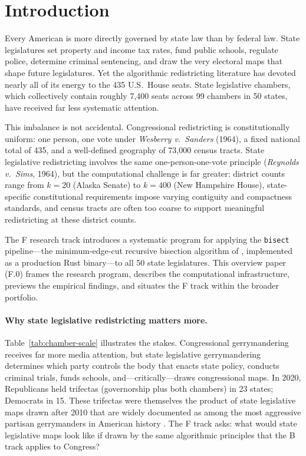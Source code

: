\section{Introduction}
\label{sec:intro}

Every American is more directly governed by state law than by federal law.
State legislatures set property and income tax rates, fund public schools,
regulate police, determine criminal sentencing, and draw the very electoral
maps that shape future legislatures. Yet the algorithmic redistricting
literature has devoted nearly all of its energy to the 435 U.S.\ House seats.
State legislative chambers, which collectively contain roughly 7,400 seats
across 99 chambers in 50 states, have received far less systematic attention.

This imbalance is not accidental. Congressional redistricting is constitutionally
uniform: one person, one vote under \emph{Wesberry v.\ Sanders} (1964), a fixed
national total of 435, and a well-defined geography of 73,000 census tracts.
State legislative redistricting involves the same one-person-one-vote principle
(\emph{Reynolds v.\ Sims}, 1964), but the computational challenge is far greater:
district counts range from $k = 20$ (Alaska Senate) to $k = 400$ (New Hampshire
House), state-specific constitutional requirements impose varying contiguity and
compactness standards, and census tracts are often too coarse to support
meaningful redistricting at these district counts.

The F research track introduces a systematic program for applying the
\texttt{bisect} pipeline---the minimum-edge-cut recursive bisection algorithm
of \citet{dellaLibera2026recursive}, implemented as a production Rust binary---to
all 50 state legislatures. This overview paper (F.0) frames the research program,
describes the computational infrastructure, previews the empirical findings,
and situates the F track within the broader portfolio.

\paragraph{Why state legislative redistricting matters more.}
Table~\ref{tab:chamber-scale} illustrates the stakes. Congressional gerrymandering
receives far more media attention, but state legislative gerrymandering determines
which party controls the body that enacts state policy, conducts criminal
trials, funds schools, and---critically---draws congressional maps.
In 2020, Republicans held trifectas (governorship plus both chambers) in 23 states;
Democrats in 15. These trifectas were themselves the product of state legislative
maps drawn after 2010 that are widely documented as among the most aggressive
partisan gerrymanders in American history
\citep{mcghee2014measuring, stephanopoulos2015partisan, chen2013unintentional}.
The F track asks: what would state legislative maps look like if drawn by the
same algorithmic principles that the B track applies to Congress?

